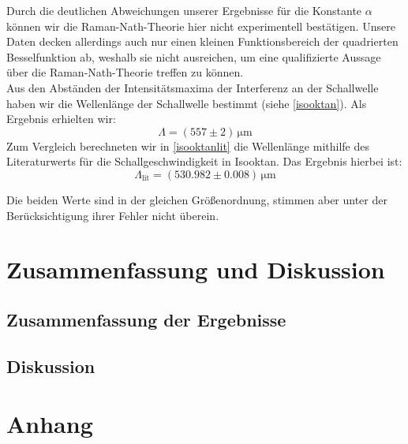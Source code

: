 \documentclass[12pt]{article}
\begin{document}
Durch die deutlichen Abweichungen unserer Ergebnisse für die Konstante $\alpha$ können wir die Raman-Nath-Theorie hier nicht experimentell bestätigen. Unsere Daten decken allerdings auch nur einen kleinen Funktionsbereich der quadrierten Besselfunktion ab, weshalb sie nicht ausreichen, um eine qualifizierte Aussage über die Raman-Nath-Theorie treffen zu können.\\

Aus den Abständen der Intensitätsmaxima der Interferenz an der Schallwelle haben wir die Wellenlänge der Schallwelle bestimmt (siehe \ref{isooktan}). Als Ergebnis erhielten wir: $$\Lambda=(557\pm2)\,\mathrm{\mu m}$$ Zum Vergleich berechneten wir in \ref{isooktanlit} die Wellenlänge mithilfe des Literaturwerts für die Schallgeschwindigkeit in Isooktan. Das Ergebnis hierbei ist: $$\Lambda_{\mathrm{lit}}=(530.982\pm0.008)\,\mathrm{\mu m}$$

Die beiden Werte sind in der gleichen Größenordnung, stimmen aber unter der Berücksichtigung ihrer Fehler nicht überein.

\newpage
\section{Zusammenfassung und Diskussion}

\subsection{Zusammenfassung der Ergebnisse}



\subsection{Diskussion}


\newpage
\section{Anhang} 
\end{document}
